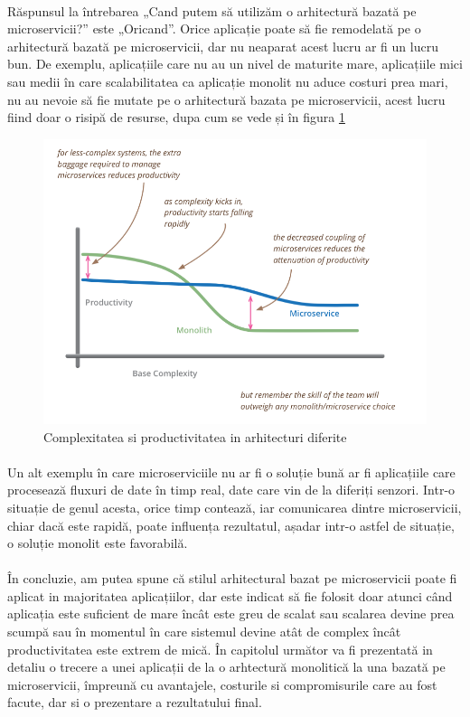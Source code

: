 \documentclass[12pt]{report}
\begin{document}
  	\paragraph{} Răspunsul la întrebarea „Cand putem să utilizăm o arhitectură bazată pe microservicii?” este „Oricand”. Orice aplicație poate să fie remodelată pe o arhitectură bazată pe microservicii, dar nu neaparat acest lucru ar fi un lucru bun. De exemplu, aplicațiile care nu au un nivel de maturite mare, aplicațiile mici sau medii în care scalabilitatea ca aplicație monolit nu aduce costuri prea mari, nu au nevoie să fie mutate pe o arhitectură bazata pe microservicii, acest lucru fiind doar o risipă de resurse, dupa cum se vede și în figura \ref{fowler}
  	\begin{figure}[h]
  	\centering
  	\includegraphics[scale=0.9]{fowler}
	\caption{Complexitatea si productivitatea in arhitecturi diferite}
	\label{fowler}
  	\end{figure}
  	\paragraph{}Un alt exemplu în care microserviciile nu ar fi o soluție bună ar fi aplicațiile care procesează fluxuri de date în timp real, date care vin de la diferiți senzori. Intr-o situație de genul acesta, orice timp contează, iar comunicarea dintre microservicii, chiar dacă este rapidă, poate influența rezultatul, așadar intr-o astfel de situație, o soluție monolit este favorabilă.
  	\paragraph{}În concluzie, am putea spune că stilul arhitectural bazat pe microservicii poate fi aplicat in majoritatea aplicațiilor, dar este indicat să fie folosit doar atunci când aplicația este suficient de mare încât este greu de scalat sau scalarea devine prea scumpă sau în momentul în care sistemul devine atât de complex încât productivitatea este extrem de mică. În capitolul următor va fi prezentată in detaliu o trecere a unei aplicații de la o arhtectură monolitică la una bazată pe microservicii, împreună cu avantajele, costurile si compromisurile care au fost facute, dar si o prezentare a rezultatului final.
\end{document}
